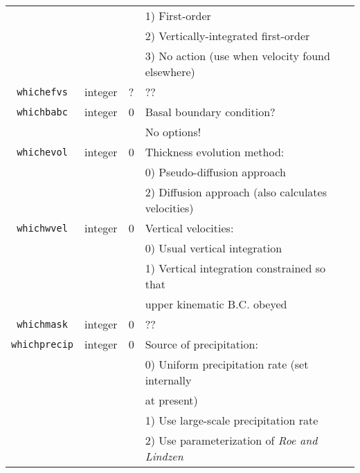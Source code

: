 \documentclass[11pt]{article}
\begin{document}
\begin{center}
\begin{tabular}{|c|c|c|l|}
 & & & 1) First-order \\
 & & & 2) Vertically-integrated first-order \\
 & & & 3) No action (use when velocity found elsewhere) \\
\hline
\texttt{whichefvs} & integer & ? & ?? \\
\hline
\texttt{whichbabc} & integer & 0 & Basal boundary condition? \\
 & & & No options!\\
\hline
\texttt{whichevol} & integer & 0 & Thickness evolution method:\\
 & & & 0) Pseudo-diffusion approach \\
 & & & 2) Diffusion approach (also calculates velocities) \\
\hline 
\texttt{whichwvel} & integer & 0 & Vertical velocities: \\
 & & & 0) Usual vertical integration \\
 & & & 1) Vertical integration constrained so that \\
 & & & upper kinematic B.C. obeyed \\
\hline 
\texttt{whichmask} & integer & 0 & ?? \\
\hline
\texttt{whichprecip} & integer & 0 & Source of precipitation:\\
 & & & 0) Uniform precipitation rate (set internally \\
 & & &  at present) \\
 & & & 1) Use large-scale precipitation rate \\
 & & & 2) Use parameterization of \emph{Roe and Lindzen} \\
\hline
\end{tabular}
\end{center}
%
\end{document}
